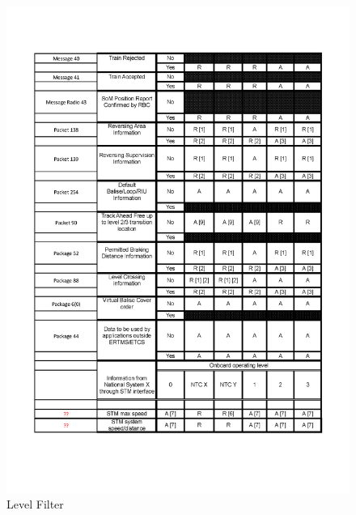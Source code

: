 \documentclass{template/openetcs_report}
\begin{document}
\begin{figure}[hbtp]
\centering
\includegraphics [scale=0.6]{images/LevelFilter4}
\caption{Level Filter}
\end{figure}
\newpage
\end{document}
